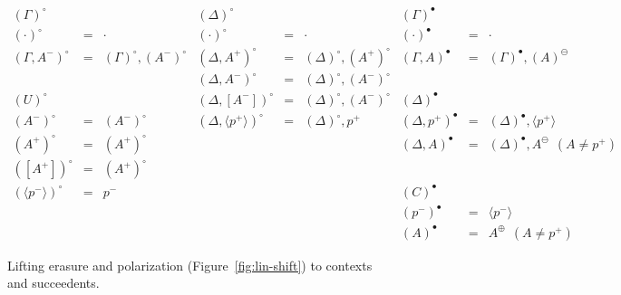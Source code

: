 \begin{figure}
{\small \[
\begin{array}{rcl|rcl|rcl}
{(\Gamma)^\circ} & & &
{(\Delta)^\circ} & & &
{(\Gamma)^\bullet} & & 
\\
(\cdot)^\circ & \!\!\!=\!\!\! & \cdot &
(\cdot)^\circ & \!\!\!=\!\!\! & \cdot &
(\cdot)^\bullet & \!\!\!=\!\!\! & \cdot 
\\
(\Gamma, A^-)^\circ & \!\!\!=\!\!\! & (\Gamma)^\circ, (A^-)^\circ &
(\Delta, A^+)^\circ & \!\!\!=\!\!\! & (\Delta)^\circ, (A^+)^\circ &
(\Gamma, A)^\bullet & \!\!\!=\!\!\! & (\Gamma)^\bullet, (A)^\ominus 
\\
& & & 
(\Delta, A^-)^\circ & \!\!\!=\!\!\! & (\Delta)^\circ, (A^-)^\circ &
& & 
\\
(U)^\circ & & &
(\Delta, [ A^- ])^\circ & \!\!\!=\!\!\! & (\Delta)^\circ, (A^-)^\circ & 
(\Delta)^\bullet & &
\\
(A^-)^\circ &  \!\!\!=\!\!\! & (A^-)^\circ &
(\Delta, \langle p^+ \rangle)^\circ & \!\!\!=\!\!\! & (\Delta)^\circ, p^+ & 
(\Delta, p^+)^\bullet & \!\!\!=\!\!\! & (\Delta)^\bullet, \langle p^+ \rangle
\\
(A^+)^\circ &  \!\!\!=\!\!\! & (A^+)^\circ &
& & &
(\Delta, A)^\bullet & \!\!\!=\!\!\! & (\Delta)^\bullet, A^\ominus ~~(A \neq p^+)
\\
([A^+])^\circ &  \!\!\!=\!\!\! & (A^+)^\circ &
& & &
& &
\\
(\langle p^- \rangle)^\circ &  \!\!\!=\!\!\! & p^- &
& & & 
(C)^\bullet & &
\\
& & & 
& & &
(p^-)^\bullet & \!\!\!=\!\!\! & \langle p^- \rangle
\\
& & & 
& & &
(A)^\bullet & \!\!\!=\!\!\! & A^\oplus ~~(A \neq p^+)
\end{array}\]}
\caption{Lifting erasure and polarization (Figure~\ref{fig:lin-shift}) to
contexts and succeedents.}
\label{fig:lin-shift-ctx}
\end{figure}
